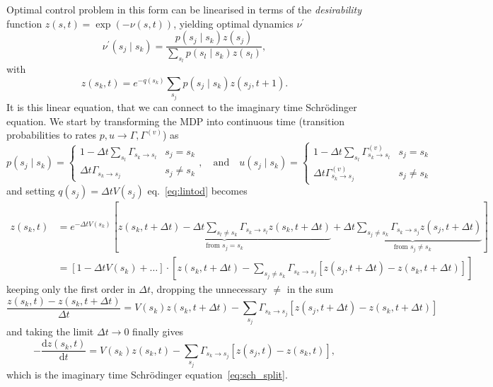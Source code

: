 Optimal control problem in this form can be linearised in terms of the \emph{desirability} function $z(s, t)=\exp (-\nu(s, t))$, yielding optimal dynamics $\nu^\prime$
\begin{equation}
	\nu^{\prime}(s_j \mid s_k)=\frac{p(s_j \mid s_k) z(s_j)}{\sum_{s_l} p(s_l \mid s_k) z(s_l)},
\end{equation}
with
\begin{equation}
	\label{eq:lintod}
	z(s_k, t)=e^{-q(s_k)} \sum_{s_j} p(s_j \mid s_k) z(s_j, t+1).
\end{equation}
It is this linear equation, that we can connect to the imaginary time Schr\" odinger equation. We start by transforming the MDP into continuous time (transition probabilities to rates $p, u \rightarrow \Gamma, \Gamma^{(v)}$) as
\begin{equation}
	p(s_j \mid s_k)=\left\{\begin{array}{ll}
	1-\Delta t \sum_{s_l} \Gamma_{s_k \rightarrow s_l} & s_j=s_k \\
	\Delta t \Gamma_{s_k \rightarrow s_j} & s_j \neq s_k
	\end{array}\right.
	, \quad \text{and} \quad 
	u(s_j \mid s_k)=\left\{\begin{array}{ll}
	1-\Delta t \sum_{s_l} \Gamma_{s_k \rightarrow s_l}^{(v)} & s_j=s_k \\
	\Delta t \Gamma_{s_k \rightarrow s_j}^{(v)} & s_j \neq s_k
	\end{array}\right.
\end{equation}
and setting $q(s_j) = \Delta t V(s_j)$ eq.~\eqref{eq:lintod} becomes
\begin{equation}
	\begin{aligned}
	z(s_k, t) &= e^{-\Delta t V(s_k)} \left[
				\underbrace{z(s_k, t + \Delta t) - \Delta t \sum_{s_l \neq s_k}\Gamma_{s_{k} \rightarrow s_{l}} z(s_k, t + \Delta t)}_{\text{from } s_j = s_k}
				+
				 \underbrace{\Delta t \sum_{s_j \neq s_k} \Gamma_{s_k \rightarrow s_j} z(s_j, t + \Delta t)}_{\text{from } s_j \neq s_k}
				\right] \\
			  &= \left[1 - \Delta t V(s_k) + \ldots\right]\cdot
			     \left[z(s_k, t + \Delta t) 
			     - \sum_{s_j \neq s_k} \Gamma_{s_k \rightarrow s_j} 
			     	\left[
			     	z(s_j, t + \Delta t) - z(s_k, t + \Delta t)\right]
		     	\right]
	\end{aligned}
\end{equation}
keeping only the first order in $\Delta t$, dropping the unnecessary $\neq$ in the sum
\begin{equation}
	\frac{z(s_k, t) - z(s_k, t + \Delta t)}{\Delta t} = V(s_k) z(s_k, t + \Delta t) - \sum_{s_j} \Gamma_{s_k \rightarrow s_j} 
	\left[
	z(s_j, t + \Delta t) - z(s_k, t + \Delta t)\right]
\end{equation}
and taking the limit $\Delta t \rightarrow 0$ finally gives
\begin{equation}
	-\frac{\mathrm{d} z(s_k, t)}{\mathrm{d} t} =  V(s_k) z(s_k, t) - \sum_{s_j} \Gamma_{s_k \rightarrow s_j} 
	\left[
	z(s_j, t) - z(s_k, t)\right],
\end{equation}
which is the imaginary time Schr\" odinger equation~\eqref{eq:sch_split}. 

